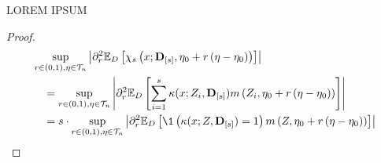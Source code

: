 \begin{boxD}
    \begin{lem}
        {\color{red} LOREM IPSUM}
    \end{lem}    
\end{boxD}

\begin{proof}
    \begin{equation}
        \begin{aligned}
            & \sup_{r \in(0,1), \eta \in \mathcal{T}_{n}}\left|
                \partial_r^2 \E_{D}\left[
                    \chi_{s}\left(x; \mathbf{D}_{[s]}, \eta_{0} + r\left(\eta-\eta_{0}\right)\right)
                \right]
            \right| \\
            & \quad = \sup_{r \in(0,1), \eta \in \mathcal{T}_{n}}\left|
                \partial_r^2 \E_{D}\left[
                    \sum_{i = 1}^{s}\kappa(x; Z_{i}, \mathbf{D}_{[s]})
                    m\left(Z_{i}, \eta_{0} + r\left(\eta-\eta_{0}\right)\right)
                \right]
            \right| \\
            & \quad = s \cdot \sup_{r \in(0,1), \eta \in \mathcal{T}_{n}}\left|
                \partial_r^2 \E_{D}\left[
                    \1\left(\kappa(x; Z, \mathbf{D}_{[s]}) = 1\right) 
                    m\left(Z, \eta_{0} + r\left(\eta-\eta_{0}\right)\right)
                \right]
            \right| \\
        \end{aligned}
    \end{equation}
\end{proof}